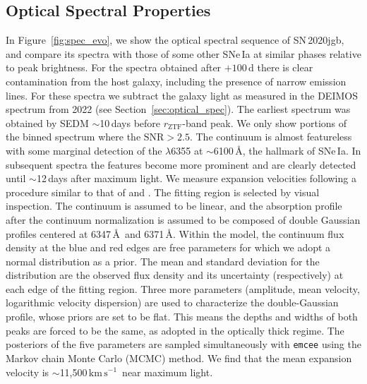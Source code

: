 \documentclass[twocolumn]{aastex631}
\newcommand{\sn}{SN\,2020jgb}
\newcommand{\kms}{$\mathrm{km}\,\mathrm{s}^{-1}$}
\begin{document}
\subsection{Optical Spectral Properties}
In Figure~\ref{fig:spec_evo}, we show the optical spectral sequence of \sn, and compare its spectra with those of some other SNe\,Ia at similar phases relative to peak brightness. For the spectra obtained after $+100$\,d there is clear contamination from the host galaxy, including the presence of narrow emission lines. For these spectra we subtract the galaxy light as measured in the DEIMOS spectrum from 2022 (see Section~\ref{sec:optical_spec}). The earliest spectrum was obtained by SEDM $\sim$10\,days before $r_\mathrm{ZTF}$-band peak. We only show portions of the binned spectrum where the $\mathrm{SNR}>2.5$. The continuum is almost featureless with some marginal detection of the  $\lambda$6355 at $\sim$6100\,\AA, the hallmark of SNe\,Ia. In subsequent spectra the  features become more prominent and are clearly detected until $\sim$12\,days after maximum light. We measure  expansion velocities following a procedure similar to that of  \citet{Childress_2013,Childress_2014} and \citet{Maguire_2014}. The fitting region is selected by visual inspection. The continuum is assumed to be linear, and the absorption profile after the continuum normalization is assumed to be composed of double Gaussian profiles centered at 6347\,\AA\ and 6371\,\AA. Within the model, the continuum flux density at the blue and red edges are free parameters for which we adopt a normal distribution as a prior. The mean and standard deviation for the distribution are the observed flux density and its uncertainty (respectively) at each edge of the fitting region. Three more parameters (amplitude, mean velocity, logarithmic velocity dispersion) are used to characterize the double-Gaussian profile, whose priors are set to be flat. This means the depths and widths of both peaks are forced to be the same, as \citet{Maguire_2014} adopted in the optically thick regime. The posteriors of the five parameters are sampled simultaneously with \texttt{emcee} \citep{emcee_2013} using the Markov chain Monte Carlo (MCMC) method. We find that the mean expansion velocity is $\sim$11,500\,\kms\ near maximum light.
\end{document}
